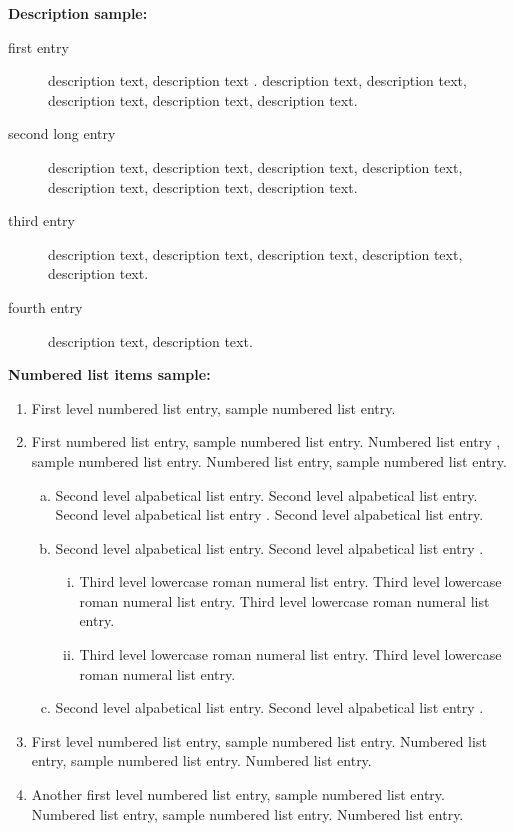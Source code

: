 \documentclass[ASNA,twocolumn]{USG} %
\begin{document}
\textbf{Description sample:}
\begin{description}
\item[first entry] description text, description text \cite{Knupp1999,Taylor1937}. description text, description text, description text, description text, description text.
\item[second long entry] description text, description text, description text, description text, description text, description text, description text.
\item[third entry] description text, description text, description text, description text, description text.
\item[fourth entry] description text, description text.
\end{description}\medskip

\textbf{Numbered list items sample:}
\begin{enumerate}
\item First level numbered list entry, sample numbered list entry.

\item First numbered list entry, sample numbered list entry. Numbered list entry \cite{Taylor1937}, sample numbered list entry. Numbered list entry, sample numbered list entry.

\begin{enumerate}[a.]
\item Second level alpabetical list entry. Second level alpabetical list entry. Second level alpabetical list entry \cite{Hoch2009}. Second level alpabetical list entry.

\item Second level alpabetical list entry. Second level alpabetical list entry \cite{Hirt1974,Benson1992}.

\begin{enumerate}[i.]
\item Third level lowercase roman numeral list entry. Third level lowercase roman numeral list entry. Third level lowercase roman numeral list entry.

\item Third level lowercase roman numeral list entry. Third level lowercase roman numeral list entry. \cite{Benson1992}
\end{enumerate}

\item Second level alpabetical list entry. Second level alpabetical list entry \cite{Dukowicz1984}.
\end{enumerate}

\item First level numbered list entry, sample numbered list entry. Numbered list entry, sample numbered list entry. Numbered list entry.

\item Another first level numbered list entry, sample numbered list entry. Numbered list entry, sample numbered list entry. Numbered list entry.
\end{enumerate}
\end{document}
